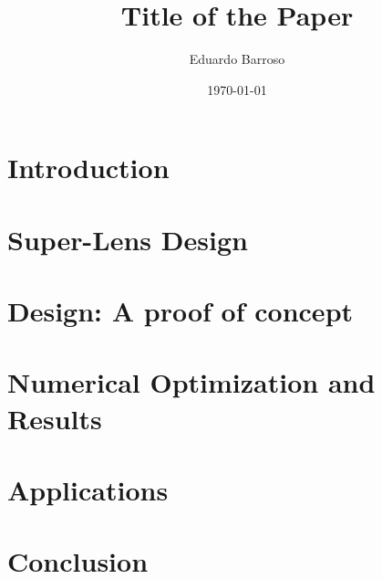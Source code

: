 \documentclass{document_layout}
\title{Title of the Paper}
\author{Eduardo Barroso}
\date{\today}
\begin{document}
\maketitle

    
\section*{Introduction}


\section{Super-Lens Design}


\section{Design: A proof of concept}


\section{Numerical Optimization and Results}


\section{Applications}


\section{Conclusion}


\printbibliography
\end{document}
